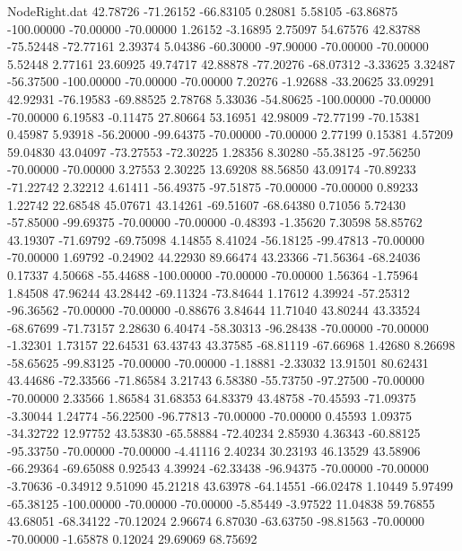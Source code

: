 \begin{filecontents}{NodeRight.dat}
  42.78726  -71.26152  -66.83105     0.28081    5.58105  -63.86875 -100.00000  -70.00000  -70.00000    1.26152   -3.16895    2.75097   54.67576
  42.83788  -75.52448  -72.77161     2.39374    5.04386  -60.30000  -97.90000  -70.00000  -70.00000    5.52448    2.77161   23.60925   49.74717
  42.88878  -77.20276  -68.07312    -3.33625    3.32487  -56.37500 -100.00000  -70.00000  -70.00000    7.20276   -1.92688  -33.20625   33.09291
  42.92931  -76.19583  -69.88525     2.78768    5.33036  -54.80625 -100.00000  -70.00000  -70.00000    6.19583   -0.11475   27.80664   53.16951
  42.98009  -72.77199  -70.15381     0.45987    5.93918  -56.20000  -99.64375  -70.00000  -70.00000    2.77199    0.15381    4.57209   59.04830
  43.04097  -73.27553  -72.30225     1.28356    8.30280  -55.38125  -97.56250  -70.00000  -70.00000    3.27553    2.30225   13.69208   88.56850
  43.09174  -70.89233  -71.22742     2.32212    4.61411  -56.49375  -97.51875  -70.00000  -70.00000    0.89233    1.22742   22.68548   45.07671
  43.14261  -69.51607  -68.64380     0.71056    5.72430  -57.85000  -99.69375  -70.00000  -70.00000   -0.48393   -1.35620    7.30598   58.85762
  43.19307  -71.69792  -69.75098     4.14855    8.41024  -56.18125  -99.47813  -70.00000  -70.00000    1.69792   -0.24902   44.22930   89.66474
  43.23366  -71.56364  -68.24036     0.17337    4.50668  -55.44688 -100.00000  -70.00000  -70.00000    1.56364   -1.75964    1.84508   47.96244
  43.28442  -69.11324  -73.84644     1.17612    4.39924  -57.25312  -96.36562  -70.00000  -70.00000   -0.88676    3.84644   11.71040   43.80244
  43.33524  -68.67699  -71.73157     2.28630    6.40474  -58.30313  -96.28438  -70.00000  -70.00000   -1.32301    1.73157   22.64531   63.43743
  43.37585  -68.81119  -67.66968     1.42680    8.26698  -58.65625  -99.83125  -70.00000  -70.00000   -1.18881   -2.33032   13.91501   80.62431
  43.44686  -72.33566  -71.86584     3.21743    6.58380  -55.73750  -97.27500  -70.00000  -70.00000    2.33566    1.86584   31.68353   64.83379
  43.48758  -70.45593  -71.09375    -3.30044    1.24774  -56.22500  -96.77813  -70.00000  -70.00000    0.45593    1.09375  -34.32722   12.97752
  43.53830  -65.58884  -72.40234     2.85930    4.36343  -60.88125  -95.33750  -70.00000  -70.00000   -4.41116    2.40234   30.23193   46.13529
  43.58906  -66.29364  -69.65088     0.92543    4.39924  -62.33438  -96.94375  -70.00000  -70.00000   -3.70636   -0.34912    9.51090   45.21218
  43.63978  -64.14551  -66.02478     1.10449    5.97499  -65.38125 -100.00000  -70.00000  -70.00000   -5.85449   -3.97522   11.04838   59.76855
  43.68051  -68.34122  -70.12024     2.96674    6.87030  -63.63750  -98.81563  -70.00000  -70.00000   -1.65878    0.12024   29.69069   68.75692

\end{filecontents}
